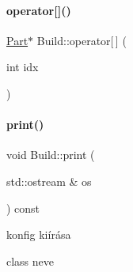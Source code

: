 \mbox{\label{class_build_aa48e871d88c60272ab5f6cd5b97aaad0}} 
\paragraph{\texorpdfstring{operator[]()}{operator[]()}\hspace{0.1cm}{\footnotesize\ttfamily [2/2]}}
{\footnotesize\ttfamily \mbox{\hyperlink{class_part}{Part}}$\ast$ Build\+::operator\mbox{[}$\,$\mbox{]} (\begin{DoxyParamCaption}\item[{int}]{idx }\end{DoxyParamCaption})\hspace{0.3cm}{\ttfamily [inline]}}

\mbox{\label{class_build_adb328444dd8bf97b36356be36db01194}} 
\paragraph{\texorpdfstring{print()}{print()}}
{\footnotesize\ttfamily void Build\+::print (\begin{DoxyParamCaption}\item[{std\+::ostream \&}]{os }\end{DoxyParamCaption}) const}



konfig kiírása 

class neve


